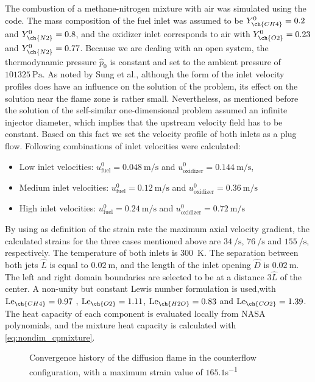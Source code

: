 The combustion of a methane-nitrogen mixture with air was simulated using the \BoSSS code. The mass composition of the fuel inlet was assumed to be  $Y^0_{\ch{CH4}} = 0.2$ and $Y^0_{\ch{N2}} = 0.8$, and the oxidizer inlet corresponds to air with   $Y^0_{\ch{O2}} = 0.23$ and $Y^0_{\ch{N2}} = 0.77$. Because we are dealing with an open system, the thermodynamic pressure $\hat p_0$ is constant and set to the ambient pressure of $\SI{101325}{\pascal}$. As noted by Sung et al., \cite{sungStructuralResponseCounterflow1995} although the form of the inlet velocity profiles does have an influence on the solution of the problem, its effect on the solution near the flame zone is rather small. Nevertheless, as mentioned before the solution of the self-similar one-dimensional problem assumed an infinite injector diameter, which implies that the upstream velocity field has to be constant. Based on this fact we set the velocity profile of both inlets as a plug flow. Following combinations of inlet velocities were calculated:
\begin{itemize}
	\item  Low inlet velocities:  $u^0_{\text{fuel}} = \SI{0.048}{\meter \per \second}$ and  $u^0_{\text{oxidizer}} = \SI{0.144}{\meter \per \second}$,
	\item Medium inlet velocities:  $u^0_{\text{fuel}} = \SI{0.12}{\meter \per \second}$ and  $u^0_{\text{oxidizer}} = \SI{0.36}{\meter \per \second}$
	\item High inlet velocities: $u^0_{\text{fuel}}  = \SI{0.24}{\meter \per \second}$ and   $u^0_{\text{oxidizer}} = \SI{0.72}{\meter \per \second}$
\end{itemize}
By using as definition of the strain rate the maximum axial velocity gradient, the calculated strains for the three cases mentioned above are $\SI{34}{\per\second}$, $\SI{76}{\per\second}$ and $\SI{155}{\per\second}$, respectively. The temperature of both inlets is \SI{300}{\kelvin}. The separation between both jets $\hat L$ is equal to $\SI{0.02}{\meter}$, and the length of the inlet opening $\hat D$ is $\SI{0.02}{\meter}$. The left and right domain boundaries are selected to be at a distance $3\hat L$ of the center. A non-unity but constant Lewis number formulation is used,with  
$\Lewis_{\ch{CH4}} =  0.97 $ , $\Lewis_{\ch{O2}} = 1.11 $, $\Lewis_{\ch{H2O}} = 0.83 $ and $\Lewis_{\ch{CO2}} = 1.39 $.\cite{smookePremixedNonpremixedTest1991} The heat capacity of each component is evaluated locally from NASA polynomials, and the mixture heat capacity is calculated with \cref{eq:nondim_cpmixture}.
\begin{figure}[t!]
	\centering
	\caption{Convergence history of the diffusion flame in the counterflow configuration, with a maximum strain value of $165.1 $\si{s^{-1}}}
	\label{fig:CDF_ConvergenceStory}
\end{figure} 

